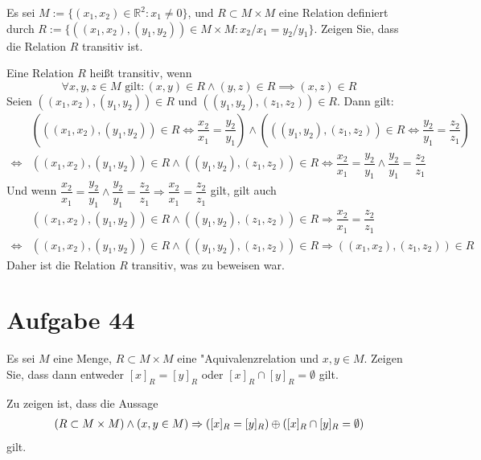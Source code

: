 \documentclass[10pt, oneside]{article}
\begin{document}
Es sei $M := \{(x_1, x_2) \in \mathbb{R}^2 : x_1 \neq 0\}$, und $R \subset M
\times M$ eine Relation definiert durch $R := \{((x_1, x_2), (y_1, y_2)) \in M
\times M : x_2/x_1 = y_2/y_1\}$. Zeigen Sie, dass die Relation $R$ transitiv
ist.

Eine Relation $R$ hei{\ss}t transitiv, wenn
\begin{equation*}
    \forall x,y,z \in M \text{ gilt} : (x, y) \in R \land (y, z) \in R \implies (x, z) \in R
\end{equation*}
Seien $((x_1, x_2), (y_1, y_2)) \in R$ und $((y_1, y_2), (z_1, z_2)) \in R$.
Dann gilt:
\begin{align*}
    &\left(((x_1, x_2), (y_1, y_2)) \in R \Leftrightarrow \dfrac{x_2}{x_1} = \dfrac{y_2}{y_1}\right)
    \land
    \left(((y_1, y_2), (z_1, z_2)) \in R \Leftrightarrow \dfrac{y_2}{y_1} = \dfrac{z_2}{z_1}\right) \\[5pt]
    \iff&
    ((x_1, x_2), (y_1, y_2)) \in R \land ((y_1, y_2), (z_1, z_2)) \in R
    \Leftrightarrow
    \dfrac{x_2}{x_1} = \dfrac{y_2}{y_1} \land \dfrac{y_2}{y_1} = \dfrac{z_2}{z_1}
\end{align*}
Und wenn $\dfrac{x_2}{x_1} = \dfrac{y_2}{y_1} \land \dfrac{y_2}{y_1} =
\dfrac{z_2}{z_1} \Rightarrow \dfrac{x_2}{x_1} = \dfrac{z_2}{z_1}$ gilt, gilt auch
\begin{align*}
    &((x_1, x_2), (y_1, y_2)) \in R \land ((y_1, y_2), (z_1, z_2)) \in R
    \Rightarrow
    \dfrac{x_2}{x_1} = \dfrac{z_2}{z_1} \\[5pt]
    \iff&
    ((x_1, x_2), (y_1, y_2)) \in R \land ((y_1, y_2), (z_1, z_2)) \in R
    \Rightarrow
    ((x_1, x_2), (z_1, z_2)) \in R
\end{align*}
Daher ist die Relation $R$ transitiv, was zu beweisen war.

\pagebreak
\section{Aufgabe 44}

Es sei $M$ eine Menge, $R \subset M \times M$ eine "Aquivalenzrelation und $x,
y \in M$. Zeigen Sie, dass dann entweder $[x]_R = [y]_R$ oder $[x]_R \cap [y]_R
= \emptyset$ gilt.

Zu zeigen ist, dass die Aussage
\begin{align*}
    (R \subset M \times M) \land (x, y \in M) \Rightarrow ([x]_R = [y]_R) \oplus ([x]_R \cap [y]_R = \emptyset)
\end{align*}
gilt.
\end{document}
